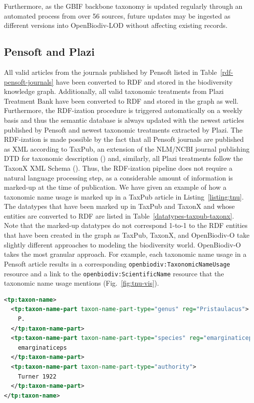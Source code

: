 Furthermore, as the GBIF backbone taxonomy is updated regularly through an automated process from over 56 sources, future updates may be ingested as different versions into OpenBiodiv-LOD without affecting existing records.

\subsection{Pensoft and Plazi}

All valid articles from the journals published by Pensoft listed in Table~\ref{rdf-pensoft-journals} have been converted to RDF and stored in the biodiversity knowledge graph. Additionally, all valid taxonomic treatments from Plazi Treatment Bank have been converted to RDF and stored in the graph as well. Furthermore, the RDF-ization procedure is triggered automatically on a weekly basis and thus the semantic database is always updated with the newest articles published by Pensoft and newest taxonomic treatments extracted by Plazi. The RDF-ization is made possible by the fact that all Pensoft journals are published as XML according to TaxPub, an extension of the NLM/NCBI journal publishing DTD for taxonomic description (\cite{catapano_taxpub:_2010}) and, similarly, all Plazi treatments follow the TaxonX XML Schema (\cite{penev_xml_2011}). Thus, the RDF-ization pipeline does not require a natural language processing step, as a considerable amount of information is marked-up at the time of publication. We have given an example of how a taxonomic name usage is marked up in a TaxPub article in Listing~\ref{listing:tnu}. The datatypes that have been marked up in TaxPub and TaxonX and whose entities are converted to RDF are listed in Table~\ref{datatypes-taxpub-taxonx}. Note that the marked-up datatypes do not correspond 1-to-1 to the RDF entities that have been created in the graph as TaxPub, TaxonX, and OpenBiodiv-O take slightly different approaches to modeling the biodiversity world. OpenBiodiv-O takes the most granular approach. For example, each taxonomic name usage in a Pensoft article results in a corresponding {\tt openbiodiv:TaxonomicNameUsage} resource and a link to the {\tt openbiodiv:ScientificName} resource that the taxonomic name usage mentions (Fig.~\ref{fig:tnu-vis}).

\begin{lstlisting}[language=XML,
caption=Taxonomic name usage of the name \emph{P. emarginaticeps} in Taxpub. Name parts are tagged with {\tt tp:taxon-name-part} and the expansion of abbreviations (regularization) is marked up with the attribute {\tt reg},
label=listing:tnu, basicstyle=\ttfamily\tiny]
<tp:taxon-name>
  <tp:taxon-name-part taxon-name-part-type="genus" reg="Pristaulacus">
    P.
  </tp:taxon-name-part>
  <tp:taxon-name-part taxon-name-part-type="species" reg="emarginaticeps">
    emarginaticeps
  </tp:taxon-name-part>
  <tp:taxon-name-part taxon-name-part-type="authority">
    Turner 1922
  </tp:taxon-name-part>
</tp:taxon-name> 
\end{lstlisting}

